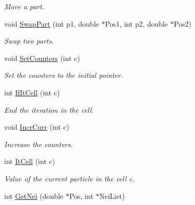 \begin{DoxyCompactItemize}
\begin{DoxyCompactList}\small\item\em Move a part. \end{DoxyCompactList}\item 
void \hyperlink{classDdArray_ae468af31d1a530ba0fdaef088c4b9c00}{Swap\+Part} (int p1, double $\ast$Pos1, int p2, double $\ast$Pos2)\hypertarget{classDdArray_ae468af31d1a530ba0fdaef088c4b9c00}{}\label{classDdArray_ae468af31d1a530ba0fdaef088c4b9c00}

\begin{DoxyCompactList}\small\item\em Swap two parts. \end{DoxyCompactList}\item 
void \hyperlink{classDdArray_aadd6f477626e28e8284b9db4649e841d}{Set\+Counters} (int c)\hypertarget{classDdArray_aadd6f477626e28e8284b9db4649e841d}{}\label{classDdArray_aadd6f477626e28e8284b9db4649e841d}

\begin{DoxyCompactList}\small\item\em Set the counters to the initial pointer. \end{DoxyCompactList}\item 
int \hyperlink{classDdArray_af49812231dd30b603631791b87eba9f9}{If\+It\+Cell} (int c)\hypertarget{classDdArray_af49812231dd30b603631791b87eba9f9}{}\label{classDdArray_af49812231dd30b603631791b87eba9f9}

\begin{DoxyCompactList}\small\item\em End the iteration in the cell. \end{DoxyCompactList}\item 
void \hyperlink{classDdArray_af5859063d6fe309152f039205b16014e}{Incr\+Curr} (int c)\hypertarget{classDdArray_af5859063d6fe309152f039205b16014e}{}\label{classDdArray_af5859063d6fe309152f039205b16014e}

\begin{DoxyCompactList}\small\item\em Increase the counters. \end{DoxyCompactList}\item 
int \hyperlink{classDdArray_a1fb1ab9e4e4c98b9860711fdb1fba3b4}{It\+Cell} (int c)\hypertarget{classDdArray_a1fb1ab9e4e4c98b9860711fdb1fba3b4}{}\label{classDdArray_a1fb1ab9e4e4c98b9860711fdb1fba3b4}

\begin{DoxyCompactList}\small\item\em Value of the current particle in the cell c. \end{DoxyCompactList}\item 
int \hyperlink{classDdArray_afe0e4e9746cdae570f8c1efdfd04ac16}{Get\+Nei} (double $\ast$Pos, int $\ast$Nei\+List)\hypertarget{classDdArray_afe0e4e9746cdae570f8c1efdfd04ac16}{}\label{classDdArray_afe0e4e9746cdae570f8c1efdfd04ac16}


\end{DoxyCompactItemize}
